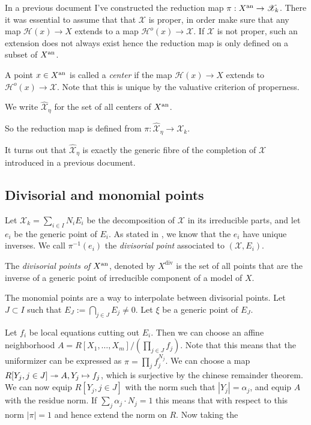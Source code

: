 In a previous document I've constructed the reduction map $\pi: X{}^{\text{an}} \to \mathscr X_k$. 
There it was essential to assume that that $\mathscr X$ is proper, in order make sure that any map $\mathcal{H} (x) \to X$ extends to a map $\mathcal{H} ^{o}(x) \to \mathscr X$. 
If $\mathscr X$ is not proper, such an extension does not always exist hence the reduction map is only defined on a subset of $X{}^{\text{an}}$. 
\begin{definition}
	A point $x \in X{}^{\text{an}} $ is called a \emph{center} if the map $\mathcal{H} (x) \to X$ extends to $\mathcal{H}^{o} (x) \to \mathscr X$. 
	Note that this is unique by the valuative criterion of properness. 

	We write $\widehat{\mathscr X}_\eta$ for the set of all centers of $X{}^{\text{an}}$. 
\end{definition}

So the reduction map is defined from $\pi: \hat{\mathscr X}_\eta \to \mathscr X_k$. 

It turns out that $\hat{\mathscr X}_\eta$ is exactly the generic fibre of the completion of $\mathscr X$ introduced in a previous document. 


\subsection{Divisorial and monomial points} \label{sec:divisorial_and_monomial_points}

Let $\mathscr X_k = \sum_{i \in I} N_i E_i$ be the decomposition of $\mathscr X$ in its irreducible parts, and let $e_i$ be the generic point of $E_i$. 
As stated in \cite[thm 2.2.4]{berkovichSpectralTheoryAnalytic2012}, we know that the $e_i$ have unique inverses. 
We call $\pi^{-1}(e_i)$ the \emph{divisorial point} associated to $(\mathscr X, E_i)$.
\begin{definition}
	The \emph{divisorial points of $X{}^{\text{an}}$}, denoted by  $X^{\text{div}}$ is the set of all points that are the inverse of a generic point of irreducible component of a model of $X$. 
\end{definition}

The monomial points are a way to interpolate between divisorial points. 
Let $J \subset  I$ such that $E_J := \bigcap_{j \in J} E_j \ne 0$.
Let $\xi$ be a generic point of $E_J$.

Let $f_i$ be local equations cutting out $E_i$.
Then we can choose an affine neighborhood $A = R[X_1, \ldots, X_m] / \left(\prod_{j \in J} f_j\right)$. 
Note that this means that the uniformizer can be expressed as $\pi = \prod_j f_j^{N_j}$. 
We can choose a map $R[Y_j, j \in J] \twoheadrightarrow A, Y_j \mapsto f_j$, which is surjective by the chinese remainder theorem.  
We can now equip $R[Y_j, j\in J]$ with the norm such that $|Y_j| = \alpha_j$, and equip $A$ with the residue norm.
If $\sum_j \alpha_j \cdot N_j = 1$ this means that with respect to this norm  $|\pi| = 1$ and hence extend the norm on $R$. 
Now taking the 


